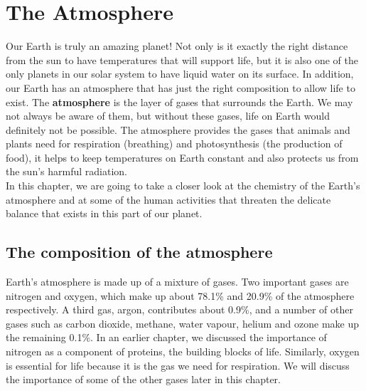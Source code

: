 \chapter{The Atmosphere}
\label{chap:atmosphere}

Our Earth is truly an amazing planet! Not only is it exactly the right distance from the sun to have temperatures that will support life, but it is also one of the only planets in our solar system to have liquid water on its surface. In addition, our Earth has an atmosphere that has just the right composition to allow life to exist. The \textbf{atmosphere} is the layer of gases that surrounds the Earth. We may not always be aware of them, but without these gases, life on Earth would definitely not be possible. The atmosphere provides the gases that animals and plants need for respiration (breathing) and photosynthesis (the production of food), it helps to keep temperatures on Earth constant and also protects us from the sun's harmful radiation. \\
In this chapter, we are going to take a closer look at the chemistry of the Earth's atmosphere and at some of the human activities that threaten the delicate balance that exists in this part of our planet.

\section{The composition of the atmosphere}
\label{sec:atmos:comp}

Earth's atmosphere is made up of a mixture of gases. Two important gases are nitrogen and oxygen, which make up about 78.1\% and 20.9\% of the atmosphere respectively. A third gas, argon, contributes about 0.9\%, and a number of other gases such as carbon dioxide, methane, water vapour, helium and ozone make up the remaining 0.1\%. In an earlier chapter, we discussed the importance of nitrogen as a component of proteins, the building blocks of life. Similarly, oxygen is essential for life because it is the gas we need for respiration. We will discuss the importance of some of the other gases later in this chapter.

